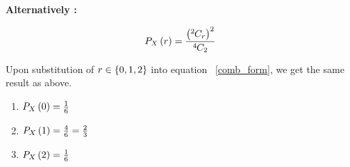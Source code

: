 \documentclass[journal,12pt,twocolumn]{IEEEtran}
\begin{document}
	
	\textbf{Alternatively :}
	
	
	\begin{align}
		P_{X}\left(r\right) = \frac{\left({{}^{2}\mkern-1muC_{r}}\right)^2}{{{}^{4}\mkern-1muC_{2}}}
			\label{comb_form}
	\end{align}
	
	Upon substitution of $r \in \left\{0, 1, 2\right\}$ into equation ~\eqref{comb_form}, we get the same result as above.
	
	\begin{enumerate}[label = \brak{\textbf{\roman*}}]

		\item $P_{X}\left(0\right) = \frac{1}{6}$
	
		\item $P_{X}\left(1\right) = \frac{4}{6} = \frac{2}{3}$
	
		\item $P_{X}\left(2\right) = \frac{1}{6}$
	
	\end{enumerate}

	
\end{document}
